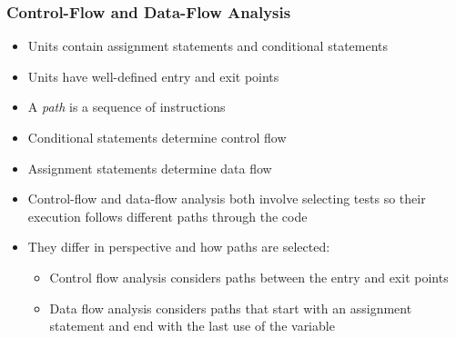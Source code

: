 \documentclass{beamer}
\begin{document}
\begin{frame}
\frametitle{Control-Flow and Data-Flow Analysis}
	\begin{itemize}
	\item Units contain assignment statements and conditional statements
	\item Units have well-defined entry and exit points
	\item A \textit{path} is a sequence of instructions
	\item Conditional statements determine control flow
	\item Assignment statements determine data flow
	\item Control-flow and data-flow analysis both involve selecting tests so their execution follows different paths through the code
	\item They differ in perspective and how paths are selected:
	\begin{itemize}
		\item Control flow analysis considers paths between the entry and exit points
		\item Data flow analysis considers paths that start with an assignment statement and end with the last use of the variable
	\end{itemize}
	\end{itemize}
\end{frame}
\end{document}
